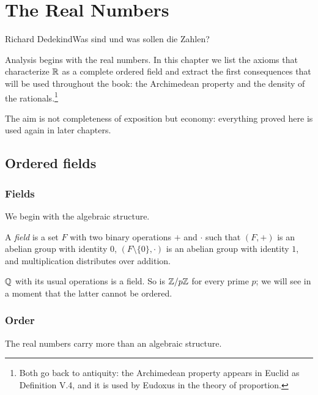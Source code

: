\chapter{The Real Numbers}\label{ch:reals}
{Richard Dedekind}{Was sind und was sollen die Zahlen?}

Analysis begins with the real numbers. In this chapter we list the axioms
that characterize $\mathbb{R}$ as a complete ordered field and extract the first
consequences that will be used throughout the book: the Archimedean property
and the density of the rationals.\footnote{Both go back to antiquity: the
Archimedean property appears in Euclid as Definition V.4, and it is used by
Eudoxus in the theory of proportion.}

The aim is not completeness of exposition but economy: everything proved
here is used again in later chapters.

\section{Ordered fields}\label{sec:ordered-fields}

\subsection{Fields}
We begin with the algebraic structure.

\begin{definition}[Field]\label{def:field}
A \emph{field} is a set $F$ with two binary operations $+$ and $\cdot$ such
that $(F,+)$ is an abelian group with identity $0$, $(F\setminus\{0\},\cdot)$
is an abelian group with identity $1$, and multiplication distributes over
addition.
\end{definition}

\begin{example}\label{ex:rationals}
$\mathbb{Q}$ with its usual operations is a field. So is $\mathbb{Z}/p\mathbb{Z}$ for every prime $p$;
we will see in a moment that the latter cannot be ordered.
\end{example}

\subsection{Order}
The real numbers carry more than an algebraic structure.

